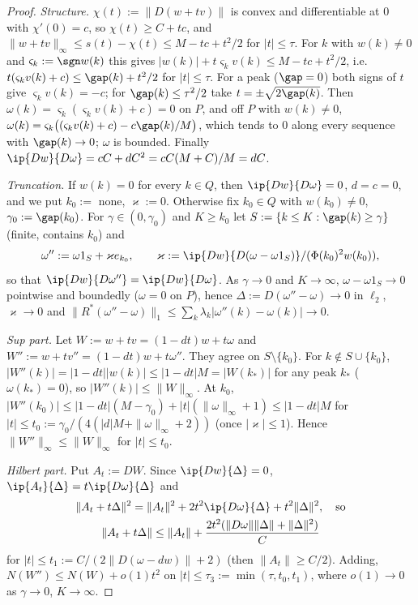 \begin{proof}
\emph{Structure.}  $\chi(t):=\|D(w+tv)\|$ is convex and differentiable at
$0$ with $\chi'(0)=c$, so $\chi(t)\ge C+tc$, and $\|w+tv\|_\infty\le s(t)-
\chi(t)\le M-tc+t^2/2$ for $|t|\le\tau$.  For $k$ with $w(k)\neq0$ and
$\varsigma_k:=\sgn w(k)$ this gives
$|w(k)|+t\varsigma_kv(k)\le M-tc+t^2/2$, i.e.\
$t(\varsigma_kv(k)+c)\le\gap(k)+t^2/2$ for $|t|\le\tau$.  For a peak
($\gap=0$) both signs of $t$ give $\varsigma_kv(k)=-c$; for $\gap(k)\le
\tau^2/2$ take $t=\pm\sqrt{2\gap(k)}$.  Then $\omega(k)=\varsigma_k(\varsigma_k
v(k)+c)=0$ on $P$, and off $P$ with $w(k)\ne0$,
$\omega(k)=\varsigma_k\big((\varsigma_kv(k)+c)-c\gap(k)/M\big)$, which tends to
$0$ along every sequence with $\gap(k)\to0$; $\omega$ is bounded.
Finally $\ip{Dw}{D\omega}=cC+dC^2=cC(M+C)/M=dC$.

\emph{Truncation.}  If $w(k)=0$ for every $k\in Q$, then
$\ip{Dw}{D\omega}=0$, $d=c=0$, and we put $k_0:=$ none, $\varkappa:=0$.
Otherwise fix $k_0\in Q$ with $w(k_0)\neq0$, $\gamma_0:=\gap(k_0)$.  For
$\gamma\in(0,\gamma_0)$ and $K\ge k_0$ let $S:=\{k\le K:\gap(k)\ge\gamma\}$
(finite, contains $k_0$) and
\[
 \omega'':=\omega1_S+\varkappa e_{k_0},\qquad
 \varkappa:=\ip{Dw}{D(\omega-\omega1_S)}/(\Phi(k_0)^2w(k_0)),
\]
so that $\ip{Dw}{D\omega''}=\ip{Dw}{D\omega}$.  As $\gamma\to0$ and
$K\to\infty$, $\omega-\omega1_S\to0$ pointwise and boundedly ($\omega=0$ on
$P$), hence $\Delta:=D(\omega''-\omega)\to0$ in $\ell_2$, $\varkappa\to0$ and
$\|R^*(\omega''-\omega)\|_1\le\sum_k\lambda_k|\omega''(k)-\omega(k)|\to0$.

\emph{Sup part.}  Let $W:=w+tv=(1-dt)w+t\omega$ and
$W'':=w+tv''=(1-dt)w+t\omega''$.  They agree on $S\setminus\{k_0\}$.  For
$k\notin S\cup\{k_0\}$, $|W''(k)|=|1-dt||w(k)|\le|1-dt|M=|W(k_*)|$ for any
peak $k_*$ ($\omega(k_*)=0$), so $|W''(k)|\le\|W\|_\infty$.  At $k_0$,
$|W''(k_0)|\le|1-dt|(M-\gamma_0)+|t|(\|\omega\|_\infty+1)\le|1-dt|M$ for
$|t|\le t_0:=\gamma_0/(4(|d|M+\|\omega\|_\infty+2))$ (once $|\varkappa|\le1$).
Hence $\|W''\|_\infty\le\|W\|_\infty$ for $|t|\le t_0$.

\emph{Hilbert part.}  Put $A_t:=DW$.  Since $\ip{Dw}{\Delta}=0$,
$\ip{A_t}{\Delta}=t\ip{D\omega}{\Delta}$ and
\begin{gather*}
 \|A_t+t\Delta\|^2=\|A_t\|^2+2t^2\ip{D\omega}{\Delta}+t^2\|\Delta\|^2,
 \quad\text{so}\\
 \|A_t+t\Delta\|\le\|A_t\|+\frac{2t^2(\|D\omega\|\|\Delta\|+\|\Delta\|^2)}{C}
\end{gather*}
for $|t|\le t_1:=C/(2\|D(\omega-dw)\|+2)$ (then $\|A_t\|\ge C/2$).  Adding,
$N(W'')\le N(W)+o(1)t^2$ on $|t|\le\tau_3:=\min(\tau,t_0,t_1)$, where
$o(1)\to0$ as $\gamma\to0$, $K\to\infty$.
\end{proof}

